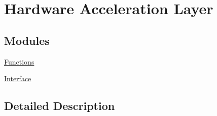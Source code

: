 \hypertarget{group__imgproc__hal}{}\section{Hardware Acceleration Layer}
\label{group__imgproc__hal}
\subsection*{Modules}
\begin{DoxyCompactItemize}
\item 
\hyperlink{group__imgproc__hal__functions}{Functions}
\item 
\hyperlink{group__imgproc__hal__interface}{Interface}
\end{DoxyCompactItemize}


\subsection{Detailed Description}
